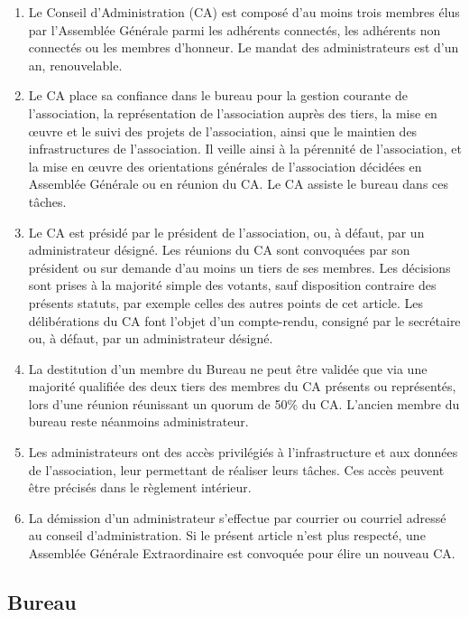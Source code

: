 \documentclass[12pt, a4paper]{article}
\begin{document}
\begin{enumerate}
    \item Le Conseil d’Administration (CA) est composé d’au moins trois membres élus par l’Assemblée Générale parmi les adhérents connectés, les adhérents non connectés ou les membres d’honneur. Le mandat des administrateurs est d’un an, renouvelable.
    \item Le CA place sa confiance dans le bureau pour la gestion courante de l’association, la représentation de l’association auprès des tiers, la mise en œuvre et le suivi des projets de l’association, ainsi que le maintien des infrastructures de l’association.  Il veille ainsi à la pérennité de l’association, et la mise en œuvre des orientations générales de l’association décidées en Assemblée Générale ou en réunion du CA. Le CA assiste le bureau dans ces tâches.
    \item Le CA est présidé par le président de l’association, ou, à défaut, par un administrateur désigné. Les réunions du CA sont convoquées par son président ou sur demande d’au moins un tiers de ses membres. Les décisions sont prises à la majorité simple des votants, sauf disposition contraire des présents statuts, par exemple celles des autres points de cet article. Les délibérations du CA font l’objet d’un compte-rendu, consigné par le secrétaire ou, à défaut, par un administrateur désigné.
    \item La destitution d’un membre du Bureau ne peut être validée que via une majorité qualifiée des deux tiers des membres du CA présents ou représentés, lors d’une réunion réunissant un quorum de 50\% du CA.  L’ancien membre du bureau reste néanmoins administrateur.
    \item Les administrateurs ont des accès privilégiés à l’infrastructure et aux données de l’association, leur permettant de réaliser leurs tâches. Ces accès peuvent être précisés dans le règlement intérieur.
    \item La démission d’un administrateur s’effectue par courrier ou courriel adressé au conseil d’administration. Si le présent article n’est plus respecté, une Assemblée Générale Extraordinaire est convoquée pour élire un nouveau CA.
\end{enumerate}

\subsection{Bureau}
\end{document}
